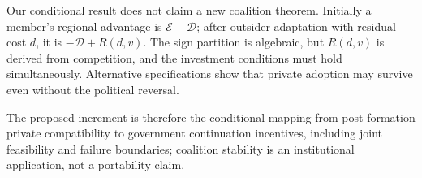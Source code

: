 Our conditional result does not claim a new coalition theorem. Initially a member's regional advantage is $\mathscr E-\mathscr D$; after outsider adaptation with residual cost $d$, it is $-\mathscr D+R(d,v)$. The sign partition is algebraic, but $R(d,v)$ is derived from competition, and the investment conditions must hold simultaneously. Alternative specifications show that private adoption may survive even without the political reversal.

The proposed increment is therefore the conditional mapping from post-formation private compatibility to government continuation incentives, including joint feasibility and failure boundaries; coalition stability is an institutional application, not a portability claim.
